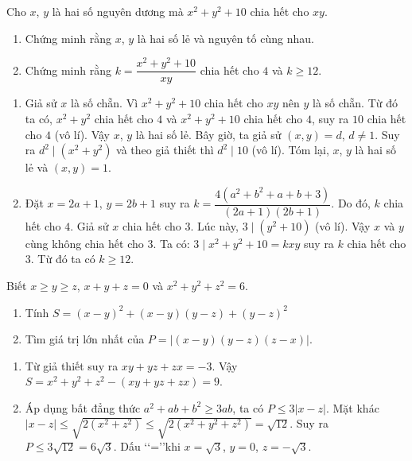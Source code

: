 \begin{ex}%
Cho $x$, $y$ là hai số nguyên dương mà $x^2+y^2+10$ chia hết cho $xy$.
    \begin{enumerate}    
        \item Chứng minh rằng $x$, $y$ là hai số lẻ và nguyên tố cùng nhau.
        \item Chứng minh rằng $k=\dfrac{x^2+y^2+10}{xy}$ chia hết cho $4$ và $k\geq 12$.
    \end{enumerate}
\loigiai
    {
    \begin{enumerate}
        \item Giả sử $x$ là số chẵn. Vì $x^2+y^2+10$ chia hết cho $xy$ nên $y$ là số chẵn. Từ đó ta có, $x^2+y^2$ chia hết cho $4$ và $x^2+y^2+10$ chia hết cho $4$, suy ra $10$ chia hết cho $4$ (vô lí). Vậy $x$, $y$ là hai số lẻ. Bây giờ, ta giả sử $(x,y)=d$, $d\neq 1$. Suy ra $d^2\mid(x^2+y^2)$ và theo giả thiết thì $d^2\mid 10$ (vô lí). Tóm lại, $x$, $y$ là hai số lẻ và $(x,y)=1$.
        
        \item Đặt $x=2a+1$, $y=2b+1$ suy ra $k=\dfrac{4(a^2+b^2+a+b+3)}{(2a+1)(2b+1)}$. Do đó, $k$ chia hết cho $4$. Giả sử $x$ chia hết cho $3$. Lúc này, $3\mid(y^2+10)$ (vô lí). Vậy $x$ và $y$ cùng không chia hết cho 3. Ta có: $3\mid x^2+y^2+10=kxy$ suy ra $k$ chia hết cho 3. Từ đó ta có $k\geq 12$.
    \end{enumerate}
    }
\end{ex}

\begin{ex}%
    Biết $x\geq y\geq z$, $x+y+z=0$ và $x^2+y^2+z^2=6$. 
    \begin{enumerate}
        \item Tính $S=\left(x-y\right)^2+\left(x-y\right)\left(y-z\right)+\left(y-z\right)^2$
        \item Tìm giá trị lớn nhất của $P=|(x-y)(y-z)(z-x)|$.
    \end{enumerate}
\loigiai
    {
    \begin{enumerate}
        \item Từ giả thiết suy ra $xy+yz+zx=-3$. Vậy $S=x^2+y^2+z^2-(xy+yz+zx)=9$.
        \item Áp dụng bất đẳng thức $a^2+ab+b^2\geq 3ab$, ta có $P\leq 3|x-z|$. Mặt khác $|x-z|\leq \sqrt{2(x^2+z^2)}\leq\sqrt{2(x^2+y^2+z^2)}=\sqrt{12}$. Suy ra $P\leq 3\sqrt{12}=6\sqrt{3}$. Dấu \lq\lq=\rq\rq  khi $x=\sqrt{3}$, $y=0$, $z=-\sqrt{3}$.
    \end{enumerate}
    }
\end{ex}

